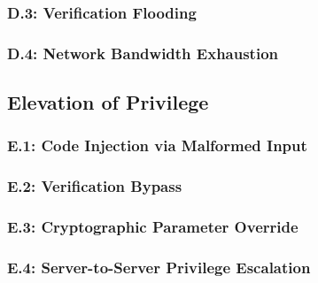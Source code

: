 \documentclass[../veristore_security_model.tex]{subfiles}
\begin{document}

\subsubsection{D.3: Verification Flooding}


\subsubsection{D.4: Network Bandwidth Exhaustion}


\subsection{Elevation of Privilege}


\subsubsection{E.1: Code Injection via Malformed Input}


\subsubsection{E.2: Verification Bypass}


\subsubsection{E.3: Cryptographic Parameter Override}


\subsubsection{E.4: Server-to-Server Privilege Escalation}


\newpage
\end{document}
